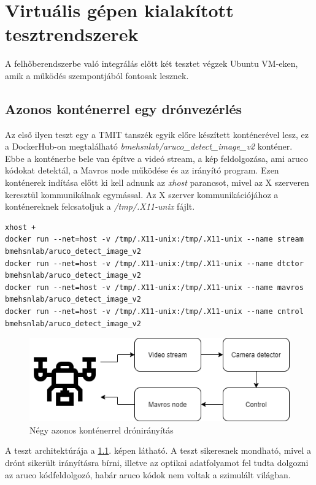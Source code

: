 \chapter{Virtuális gépen kialakított tesztrendszerek}
A felhőberendszerbe való integrálás előtt két tesztet végzek Ubuntu VM-eken, amik a működés szempontjából fontosak lesznek.
\section{Azonos konténerrel egy drónvezérlés}
Az első ilyen teszt egy a TMIT tanszék egyik előre készített konténerével lesz, ez a DockerHub-on megtalálható \emph{bmehsnlab/aruco\_detect\_image\_v2} konténer. Ebbe a konténerbe bele van építve a videó stream, a kép feldolgozása, ami aruco kódokat detektál, a Mavros node működése és az irányító program.
Ezen konténerek indítása előtt ki kell adnunk az \emph{xhost} parancsot, mivel az X szerveren keresztül kommunikálnak egymással. Az X szerver kommunikációjához a konténereknek felcsatoljuk a \emph{/tmp/.X11-unix} fájlt.
\begin{lstlisting}[caption={Azonos konténerek indítása négy különböző feladattal és az X szerveren való kommunikációt megvalósítva}]
xhost +
docker run --net=host -v /tmp/.X11-unix:/tmp/.X11-unix --name stream bmehsnlab/aruco_detect_image_v2
docker run --net=host -v /tmp/.X11-unix:/tmp/.X11-unix --name dtctor bmehsnlab/aruco_detect_image_v2
docker run --net=host -v /tmp/.X11-unix:/tmp/.X11-unix --name mavros bmehsnlab/aruco_detect_image_v2
docker run --net=host -v /tmp/.X11-unix:/tmp/.X11-unix --name cntrol bmehsnlab/aruco_detect_image_v2
\end{lstlisting}
\begin{figure}
	\centering
	\includegraphics[width=\linewidth]{figures/local.png}
	\caption{Négy azonos konténerrel drónirányítás}
	\label{fig:azonos}
\end{figure}
A teszt architektúrája a \ref{fig:azonos}. képen látható. A teszt sikeresnek mondható, mivel a drónt sikerült irányításra bírni, illetve az optikai adatfolyamot fel tudta dolgozni az aruco kódfeldolgozó, habár aruco kódok nem voltak a szimulált világban.

